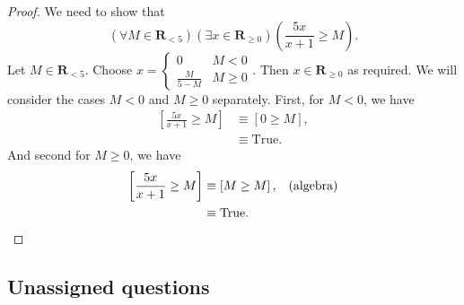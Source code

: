 \documentclass[12pt,fleqn,answers]{exam}
\newcommand{\reals}{\mathbf{R}}
\newcommand{\true}{\mathrm{True}}
\renewenvironment{solution}
  {\begin{shaded*}} %
  {\end{shaded*}}   %
\begin{document}
\begin{questions}
\begin{solution}

\begin{proof} We need to show that 
  \begin{equation*}
    \left(\forall M \in  \reals_{< 5} \right)
    \left(\exists x \in  \reals_{\geq 0} \right) 
    \left(\frac{5 x}{x+1} \geq   M \right).
    \end{equation*}
    Let $M \in \reals_{< 5}$. Choose 
  $x = \begin{cases}  0 & M < 0 \\
                      \frac{M}{5-M} & M \geq 0 
  \end{cases}$. Then $x \in \reals_{\geq 0}$ as required.
  We will consider the cases $M < 0$ and $M \geq 0$ separately.
  First, for $M < 0$, we have
  \begin{align*}
    \left[ \frac{5 x}{x+1}  \geq  M \right] &\equiv \left[0 \geq  M \right], \\
                                            &\equiv \true.
  \end{align*}
  And second for $M \geq 0$, we have
  \begin{align*}
    \left[ \frac{5 x}{x+1}  \geq  M \right] 
       &\equiv \left[M \geq  M \right], &&\text{(algebra)} \\
      &\equiv \true. \qedhere
  \end{align*}


\end{proof}
  
\end{solution}
 
\end{questions}

\subsection*{Unassigned questions}
\end{document}
